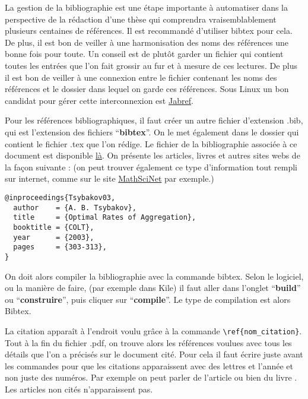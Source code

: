 

La gestion de la bibliographie est une étape importante à automatiser dans la perspective 
de la rédaction d'une thèse qui comprendra vraisemblablement plusieurs centaines de références.
Il est recommandé d'utiliser bibtex pour cela. De plus, il est bon de veiller à une harmonisation
des noms des références une bonne fois pour toute. Un conseil est de plutôt garder un fichier 
qui contient toutes les entrées que l'on fait grossir au fur et \`a mesure de ces lectures.
De plus il est bon de veiller à une connexion entre le fichier contenant les noms des références
et le dossier dans lequel on garde ces références. Sous Linux un bon candidat pour gérer
cette interconnexion est \href{http://jabref.sourceforge.net/}{Jabref}.


Pour les références bibliographiques,  il faut créer un autre fichier d'extension .bib, qui est 
l'extension des fichiers ``\textbf{bibtex}''. On le met également dans le dossier qui contient le 
fichier .tex que l'on rédige. Le fichier de la bibliographie associée à ce document est disponible
 \href{http://josephsalmon.eu/enseignement/M1/refs.bib}{là}.  On présente les articles, 
livres et autres sites webs de la façon suivante : (on peut trouver également ce type d'information
 tout rempli sur internet, comme sur le site \href{http://ams.u-strasbg.fr/mathscinet/}{MathSciNet}
 par exemple.)\medskip
\begin{lstlisting}
@inproceedings{Tsybakov03, 
  author    = {A. B. Tsybakov},
  title     = {Optimal Rates of Aggregation}, 
  booktitle = {COLT}, 
  year      = {2003}, 
  pages     = {303-313}, 
}
\end{lstlisting}

On doit alors compiler la bibliographie avec la commande bibtex. 
Selon le logiciel, ou la mani\`ere de faire,   (par exemple dans Kile) il faut aller dans l'onglet 
``\textbf{build}'' ou ``\textbf{construire}'', puis cliquer sur ``\textbf{compile}''. Le type de 
compilation est alors Bibtex.\medskip

La citation apparaît à l'endroit voulu grâce à la commande  \lstinline+\ref{nom_citation}+. 
Tout à la fin du fichier .pdf, on trouve alors  les références voulues avec tous les détails que l'on
 a précisés 
sur le document cité. 
Pour cela il faut  écrire juste avant \lstinline++ les commandes 
\lstinline++
\lstinline++ pour que les citations apparaissent avec des lettres et l'année
 et non juste des numéros. Par exemple on peut parler de l'article \cite{Tsybakov03} ou bien du livre 
\cite{Catoni04}. Les articles non cités n'apparaissent pas. \medskip

